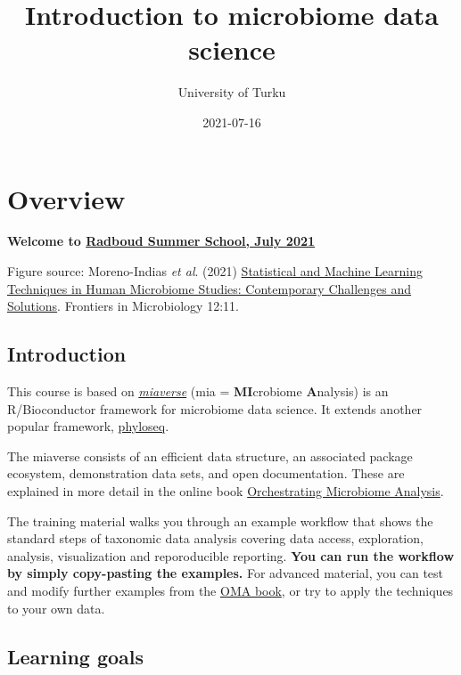 \documentclass[
  oneside]{book}
\title{Introduction to microbiome data science}
\author{University of Turku}
\date{2021-07-16}
\begin{document}
\maketitle

{
\setcounter{tocdepth}{1}
\tableofcontents
}
\hypertarget{overview}{%
\chapter{Overview}\label{overview}}

\textbf{Welcome to \href{https://www.ru.nl/radboudsummerschool/courses/2021/brain-bacteria-behaviour/}{Radboud Summer School, July 2021}}

Figure source: Moreno-Indias \emph{et al}. (2021) \href{https://doi.org/10.3389/fmicb.2021.635781}{Statistical and Machine Learning Techniques in Human Microbiome Studies: Contemporary Challenges and Solutions}. Frontiers in Microbiology 12:11.

\hypertarget{introduction}{%
\section{Introduction}\label{introduction}}

This course is based on \href{https://microbiome.github.io}{\emph{miaverse}} (mia = \textbf{MI}crobiome \textbf{A}nalysis) is an
R/Bioconductor framework for microbiome data science. It extends another popular framework, \href{https://joey711.github.io/phyloseq/}{phyloseq}.

The miaverse consists of an efficient data structure, an
associated package ecosystem, demonstration data sets, and open
documentation. These are explained in more detail in the online book
\href{https://microbiome.github.io/OMA}{Orchestrating Microbiome Analysis}.

The training material walks you through an example workflow that
shows the standard steps of taxonomic data analysis covering data
access, exploration, analysis, visualization and reporoducible
reporting. \textbf{You can run the workflow by simply copy-pasting the
examples.} For advanced material, you can test and modify further
examples from the \href{https://microbiome.github.io/OMA}{OMA book}, or try
to apply the techniques to your own data.

\hypertarget{learning-goals}{%
\section{Learning goals}\label{learning-goals}}
\end{document}

